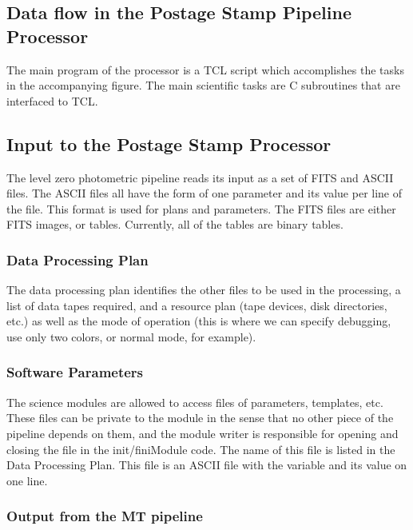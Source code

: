 \subsection{Data flow in the Postage Stamp Pipeline Processor}

	The main program of the processor is a TCL script which accomplishes
the tasks in the accompanying figure.  The main scientific tasks are C
subroutines that are interfaced to TCL.


\subsection{Input to the Postage Stamp Processor}

The level zero photometric pipeline reads its input as a set of FITS and 
ASCII files.  The ASCII files all have the form of one parameter and its
value per line of the file.  This format is used for plans and parameters.
The FITS files are either FITS images, or tables.  Currently, all of the
tables are binary tables.

\subsubsection{Data Processing Plan}

	The data processing plan identifies the other files to be used in
the processing, a list of data tapes required, and a resource plan (tape
devices, disk directories, etc.) as well as the mode of operation (this is
where we can specify debugging, use only two colors, or
normal mode, for example).

\subsubsection{Software Parameters}

The science modules are allowed to access files of parameters,
templates, etc.  These files can be private to the module in the sense
that no other piece of the pipeline depends on them, and the module
writer is responsible for opening and closing the file in the
init/finiModule code.  The name of this
file is listed in the Data Processing Plan.
This file is an ASCII file with the variable and its value on one line.

\subsubsection{Output from the MT pipeline}

